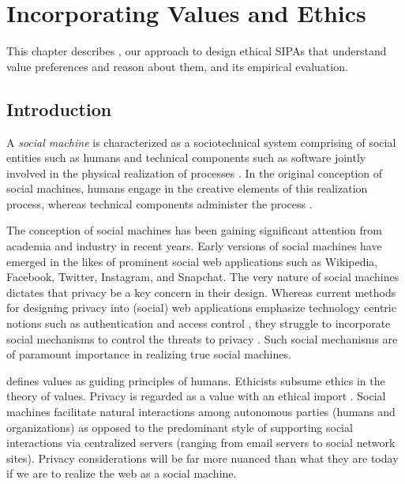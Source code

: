 \chapter{Incorporating Values and Ethics}
\label{chap:ainur}

This chapter describes \frameworkAinur, our approach to 
design ethical SIPAs that understand value preferences and
reason about them, and its empirical evaluation.

\section{Introduction}

A \emph{social machine} is characterized as a sociotechnical system comprising
of social entities such as humans and technical components such as
software jointly involved in the physical realization of processes \citep{Smart+14:social-machines,WWW-16:IOSE}. In the original
conception of social machines, humans engage in
the creative elements of this realization process, whereas technical components  administer the process \citep{Berners-Lee-99:Weaving}.

The conception of social machines has been gaining significant attention from academia and industry in recent years. Early versions of social machines have emerged in the likes of prominent social web applications such as Wikipedia, Facebook, Twitter, Instagram, and Snapchat. The very nature of social machines dictates that privacy be a key concern in their design. Whereas current methods for designing privacy into (social) web applications emphasize technology centric notions such as authentication \citep{Ruoti-WWW2015-AuthenticationMelee} and access control \citep{Paci-CSUR2018-CollaborativeAccessControl}, they struggle to incorporate social mechanisms to control the threats to privacy \citep{Hendler-AI2010-SocialMachine}. Such social mechanisms are of paramount importance in realizing true social machines.

\citet{schwartz2012overview} defines values as guiding principles of humans. Ethicists subsume ethics in the theory of values. Privacy is 
regarded as a value with an ethical import \citep{Langheinrich-01:privacy,Taylor-2002-PrivacyAutonomy}. 
% 
Social machines facilitate natural interactions among autonomous parties (humans and organizations) as opposed to the predominant style of supporting social interactions via centralized servers (ranging from email servers to social network sites).
Privacy considerations will be far more nuanced than what
they are today if we are to realize the web as a social machine.

